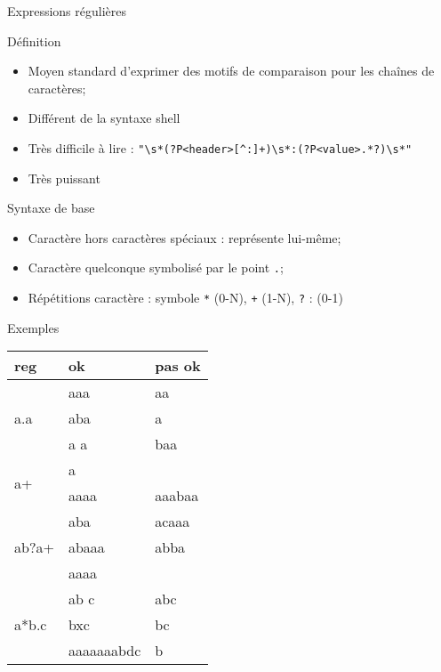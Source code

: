 \documentclass[handout,10pt]{beamer}
\begin{document}
\begin{frame}[fragile]{Expressions régulières}
\tiny
 \begin{block}{Définition}
  \begin{itemize}
   \item Moyen standard d'exprimer des motifs de comparaison pour les chaînes de caractères;
   \item Différent de la syntaxe shell
   \item Très difficile à lire : \lstinline$"\s*(?P<header>[^:]+)\s*:(?P<value>.*?)\s*"$
   \item Très puissant
  \end{itemize}
 \end{block}
 \begin{block}{Syntaxe de base}
  \begin{itemize}
   \item Caractère hors caractères spéciaux : représente lui-même;
   \item Caractère quelconque symbolisé par le point \lstinline$.$;
   \item Répétitions caractère : symbole \lstinline$*$ (0-N), \lstinline$+$ (1-N), \lstinline$?$ : (0-1)
  \end{itemize}
 \end{block}
 \begin{exampleblock}{Exemples}
 \begin{center}
 \begin{tabular}{|l|l|l|}\hline
 reg & ok & pas ok \\ \hline
 \multirow{3}{*}{a.a} & aaa & aa \\ 
  & aba & a \\
  & a a & baa \\ \hline
 \multirow{2}{*}{a+} & a & \\
 & aaaa & aaabaa \\ \hline
 \multirow{3}{*}{ab?a+} & aba & acaaa \\ 
 & abaaa & abba \\
 & aaaa & \\ \hline
 \multirow{3}{*}{a*b.c} & ab c & abc \\
 & bxc & bc \\
 & aaaaaaabdc & b \\ \hline
 \end{tabular}
 \end{center}
 \end{exampleblock}
\end{frame}
\end{document}
